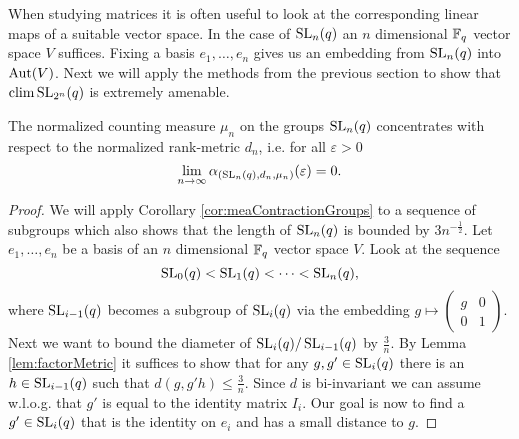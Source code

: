 When studying matrices it is often useful to look at the corresponding linear maps of a suitable vector space. 
In the case of $\operatorname{SL}_n(q)$ an $n$ dimensional $\mathbb{F}_q$ vector space $V$ suffices. Fixing a basis $e_1,\dots,e_n$ gives us an embedding from $\operatorname{SL}_n(q)$ into $\operatorname{Aut}(V)$. Next we will apply the methods from the previous section to show that $\operatorname{clim} \operatorname{SL}_{2^n}(q)$ is extremely amenable.
\begin{theorem}\label{thm:SLConcentrates}
	The normalized counting measure $\mu_n$ on the groups $\operatorname{SL}_{n}(q)$ concentrates with respect to the normalized rank-metric $d_n$, i.e. for all $\varepsilon>0$
	\[\lim_{n\to\infty} \alpha_{(\operatorname{SL}_{n}(q), d_n, \mu_n)}(\varepsilon)=0 .\]
\end{theorem}
\begin{proof}
	We will apply Corollary \ref{cor:meaContractionGroups} to a sequence of subgroups which also shows that the length of  $\operatorname{SL}_n(q)$ is bounded by $3n^{-\frac{1}{2}}$.
	Let $e_1,\dots,e_n$ be a basis of an $n$ dimensional $\mathbb{F}_q$ vector space $V$. Look at the sequence
	\[\operatorname{SL}_0(q)<\operatorname{SL}_1(q)<\dots<\operatorname{SL}_n(q),\]
	where $\operatorname{SL}_{i-1}(q)$ becomes a subgroup of $\operatorname{SL}_i(q)$ via the embedding $g\mapsto 
	\begin{pmatrix}
		g & 0 \\
		0 & 1 
	\end{pmatrix}$. Next we want to bound the diameter of $\operatorname{SL}_{i}(q)/\operatorname{SL}_{i-1}(q)$ by $\frac{3}{n}$. By Lemma \ref{lem:factorMetric} it suffices to show that for any $g,g'\in\operatorname{SL}_i(q)$ there is an $h\in \operatorname{SL}_{i-1}(q)$ such that $d(g,g'h)\leq\frac{3}{n}$. Since $d$ is bi-invariant we can assume w.l.o.g. that $g'$ is equal to the identity matrix $I_i$. 
	Our goal is now to find a $g'\in\operatorname{SL}_i(q)$ that is the identity on $e_i$ and has a small distance to $g$.
				

\end{proof}
